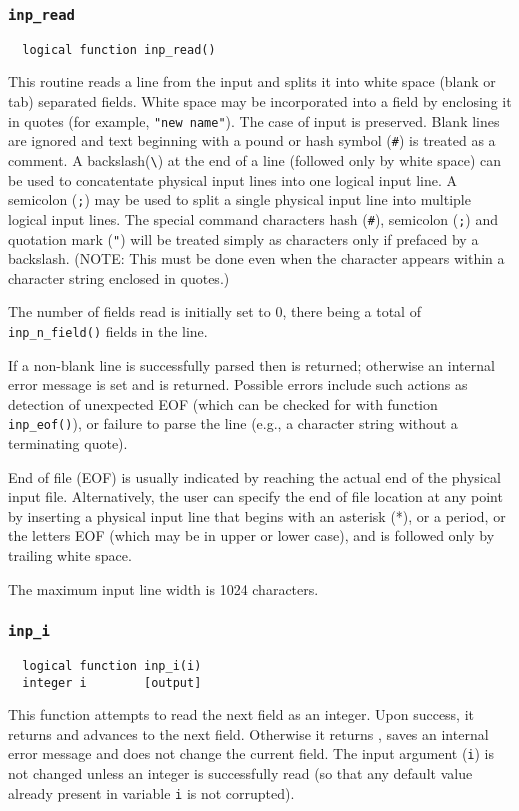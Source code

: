 \subsubsection{{\tt inp\_read}}
\begin{verbatim}
  logical function inp_read()
\end{verbatim}
This routine reads a line from the input and splits it into white space (blank or
tab) separated fields.  White space may be incorporated into a field
by enclosing it in quotes (for example, \verb+"new name"+).  The case of input is preserved.
Blank lines are ignored and text beginning with a pound or hash symbol
(\verb+#+) is treated as a comment.  A
backslash(\verb+\+) at the end of a line (followed only by white space)
can be used to concatentate physical input lines into one
logical input line.  A semicolon (\verb+;+) may be used to split a
single physical input line into multiple logical input lines.  The special
command characters hash (\verb+#+), semicolon (\verb+;+) and quotation mark
(\verb+"+) will be treated simply as characters only if prefaced by a
backslash. (NOTE:  This must be done even when the character appears within a
character string enclosed in quotes.)

The number of fields read is initially set to 0, there being a total of
\verb+inp_n_field()+ fields in the line.

If a non-blank line is successfully parsed then \TRUE is returned;
otherwise an internal error message is set and \FALSE is returned.
Possible errors include such actions as detection of unexpected EOF 
(which can be checked for with 
function {\tt inp\_eof()}),
or failure to parse the line (e.g., a
character string without a terminating quote).

End of file (EOF) is usually indicated by reaching the actual 
end of the physical input file.  Alternatively, the user can specify
the end of file location at any point by inserting a
physical input line that begins with an asterisk (*), or a period,
or the letters EOF (which may be in upper or lower case), and is followed
only by trailing white space.

The maximum input line width is 1024 characters.

\subsubsection{{\tt inp\_i}}
\begin{verbatim}
  logical function inp_i(i)
  integer i        [output]
\end{verbatim}
This function attempts to read the next field as an integer.  Upon success, it returns
\TRUE and advances to the next field.  Otherwise it returns \FALSE,
saves an internal error message and does not change the
current field.  The input argument ({\tt i}) is not changed unless an
integer is successfully read (so that any default value already
present in variable \verb+i+ is not corrupted).

